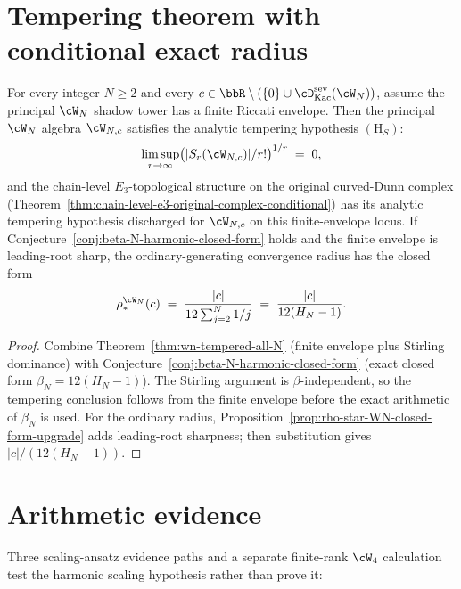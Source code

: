 \section{Tempering theorem with conditional exact radius}
\label{sec:tempering-theorem-healed}

\begin{theorem}
\label{thm:wn-tempered-exact-radius}
\ClaimStatusConditional
For every integer $N \ge 2$ and every $c \in \bbR \setminus (\{0\} \cup
\cD^{\mathrm{sev}}_{\mathrm{Kac}}(\cW_N))$, assume the principal
$\cW_N$ shadow tower has a finite Riccati envelope. Then the principal
$\cW_N$ algebra $\cW_{N,c}$ satisfies the analytic tempering hypothesis
$(\mathrm{H}_S)$:
\[
 \limsup_{r \to \infty}
 \bigl( \lvert S_r(\cW_{N,c}) \rvert / r! \bigr)^{1/r}
 \;=\;
 0,
\]
and the chain-level $E_3$-topological structure on the original
curved-Dunn complex
(Theorem~\ref{thm:chain-level-e3-original-complex-conditional}) has
its analytic tempering hypothesis discharged for $\cW_{N,c}$ on this
finite-envelope locus. If Conjecture~\ref{conj:beta-N-harmonic-closed-form}
holds and the finite envelope is leading-root sharp, the
ordinary-generating convergence radius has the closed form
\[
 \rho_*^{\cW_N}(c)
 \;=\;
 \frac{|c|}{12 \sum_{j=2}^{N} 1/j}
 \;=\;
 \frac{|c|}{12(H_N - 1)}.
\]
\end{theorem}

\begin{proof}
Combine Theorem~\ref{thm:wn-tempered-all-N} (finite envelope plus
Stirling dominance) with Conjecture~\ref{conj:beta-N-harmonic-closed-form}
(exact closed form $\beta_N = 12(H_N - 1)$). The Stirling argument is
$\beta$-independent, so the tempering conclusion follows from the finite
envelope before the exact arithmetic of $\beta_N$ is used. For the
ordinary radius, Proposition~\ref{prop:rho-star-WN-closed-form-upgrade}
adds leading-root sharpness; then substitution gives
$|c|/(12(H_N - 1))$.
\end{proof}

\section{Arithmetic evidence}
\label{sec:beta-N-independent-verification}

Three scaling-ansatz evidence paths and a separate finite-rank
$\cW_4$ calculation test the harmonic scaling hypothesis rather than
prove it:

